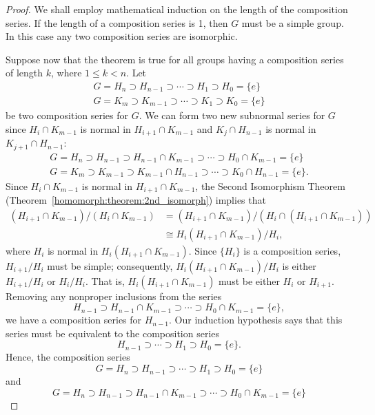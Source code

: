  
\begin{proof}
We shall employ mathematical induction on the length of the
composition series.  If the length of a composition series is 1, 
then $G$ must be a simple group.  In this case any two composition
series are isomorphic.
 
 
Suppose now that the theorem is true for all groups having a
composition series of length $k$, where $1 \leq k <n$. Let 
\begin{gather*}
G = H_n \supset H_{n-1} \supset \cdots \supset H_1 \supset
H_0 = \{ e \} \\
G = K_m \supset K_{m-1} \supset \cdots \supset K_1 \supset
K_0 = \{ e \}
\end{gather*}
be two composition series for $G$.  We can form two new subnormal
series for $G$ since $H_i \cap K_{m-1}$ is normal in $H_{i+1} \cap
K_{m-1}$ and $K_j \cap H_{n-1}$ is normal in $K_{j+1} \cap H_{n-1}$:
\begin{gather*}
G = H_n \supset H_{n-1} \supset H_{n-1} \cap K_{m-1} \supset 
\cdots \supset H_0 \cap K_{m-1} = \{ e \} \\
G = K_m \supset K_{m-1} \supset K_{m-1} \cap H_{n-1} \supset 
\cdots \supset K_0 \cap H_{n-1} = \{ e \}.
\end{gather*}
Since $H_i \cap K_{m-1}$ is normal in $H_{i+1} \cap K_{m-1}$, the
Second Isomorphism Theorem (Theorem~\ref{homomorph:theorem:2nd_isomorph}) implies that 
\begin{align*}
(H_{i+1} \cap K_{m-1}) / (H_i \cap K_{m-1}) 
& =  (H_{i+1} \cap K_{m-1}) / (H_i \cap ( H_{i+1} \cap K_{m-1} )) \\
& \cong  H_i (H_{i+1} \cap K_{m-1})/ H_i,
\end{align*}
where $H_i$ is normal in $H_i (H_{i+1} \cap K_{m-1})$. Since $\{ H_i
\}$  is a composition series, $H_{i+1} / H_i$ must be simple;
consequently, $H_i (H_{i+1} \cap K_{m-1})/ H_i$ is either $H_{i+1}/
H_i$ or $H_i/H_i$.  That is, $H_i (H_{i+1} \cap K_{m-1})$ must be
either $H_i$ or $H_{i+1}$. Removing any nonproper inclusions from the
series 
\[
H_{n-1} \supset H_{n-1} \cap K_{m-1} \supset 
\cdots \supset H_0 \cap K_{m-1} = \{ e \}, 
\]
we have a composition series for $H_{n-1}$. Our induction hypothesis
says that this series must be equivalent to the composition series
\[
H_{n-1} \supset \cdots \supset H_1 \supset H_0 = \{ e \}.
\]
Hence, the composition series
\[
G = H_n \supset H_{n-1} \supset \cdots \supset H_1 \supset
H_0 = \{ e \} 
\]
and 
\[
G = H_n \supset H_{n-1} \supset H_{n-1} \cap K_{m-1} \supset 
\cdots \supset H_0 \cap K_{m-1} = \{ e \} 
\]
\end{proof}

